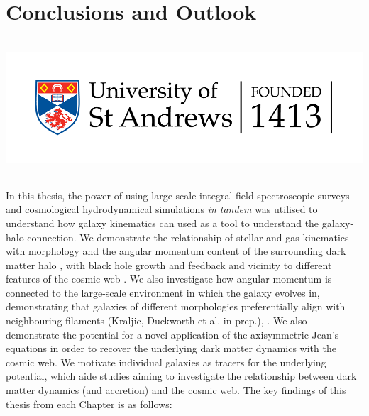 \chapter{Conclusions and Outlook}
\vspace{-5in}
\includegraphics[height=2.0in]{thesis/latex/st_a_logo_.png}
\vspace{3in}

In this thesis, the power of using large-scale integral field spectroscopic surveys and cosmological hydrodynamical simulations \textit{in tandem} was utilised to understand how galaxy kinematics can used as a tool to understand the galaxy-halo connection. We demonstrate the relationship of stellar and gas kinematics with morphology and the angular momentum content of the surrounding dark matter halo \citep{duckworth2020a}, with black hole growth and feedback \citep{duckworth2020b} and vicinity to different features of the cosmic web \citep{duckworth2019}. We also investigate how angular momentum is connected to the large-scale environment in which the galaxy evolves in, demonstrating that galaxies of different morphologies preferentially align with neighbouring filaments (Kraljic, Duckworth et al. in prep.), . We also demonstrate the potential for a novel application of the axisymmetric Jean's equations in order to recover the underlying dark matter dynamics with the cosmic web. We motivate individual galaxies as tracers for the underlying potential, which aide studies aiming to investigate the relationship between dark matter dynamics (and accretion) and the cosmic web. The key findings of this thesis from each Chapter is as follows:

